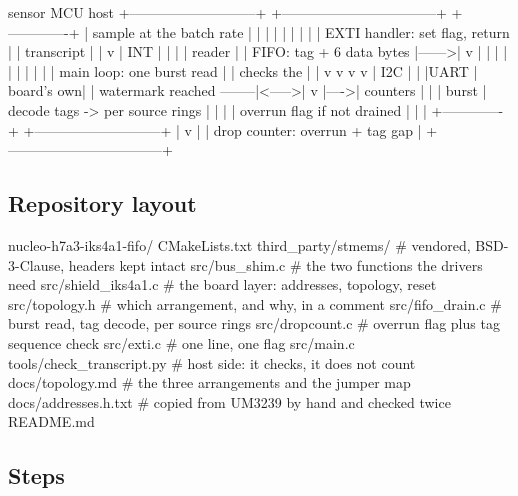 \begin{asciiart}
  sensor                              MCU                                     host
  +---------------------------+       +---------------------------------+     +-------------+
  | sample at the batch rate  |       |                                 |     |             |
  |   |                       |       | EXTI handler: set flag, return  |     | transcript  |
  |   v                       | INT   |   |                             |     |  reader     |
  | FIFO: tag + 6 data bytes  |------>|   v                             |     |             |
  |   |   |   |   |           |       | main loop: one burst read       |     |  checks the |
  |   v   v   v   v           | I2C   |   |                             |UART |  board's own|
  | watermark reached --------|<----->|   v                             |---->|  counters   |
  |                           | burst | decode tags -> per source rings |     |             |
  | overrun flag if not drained       |   |                             |     +-------------+
  +---------------------------+       |   v                             |
                                      | drop counter: overrun + tag gap |
                                      +---------------------------------+
\end{asciiart}

\subsection*{Repository layout}

\begin{plaincode}
nucleo-h7a3-iks4a1-fifo/
  CMakeLists.txt
  third_party/stmems/            # vendored, BSD-3-Clause, headers kept intact
  src/bus_shim.c                 # the two functions the drivers need
  src/shield_iks4a1.c            # the board layer: addresses, topology, reset
  src/topology.h                 # which arrangement, and why, in a comment
  src/fifo_drain.c               # burst read, tag decode, per source rings
  src/dropcount.c                # overrun flag plus tag sequence check
  src/exti.c                     # one line, one flag
  src/main.c
  tools/check_transcript.py      # host side: it checks, it does not count
  docs/topology.md               # the three arrangements and the jumper map
  docs/addresses.h.txt           # copied from UM3239 by hand and checked twice
  README.md
\end{plaincode}

\subsection*{Steps}

